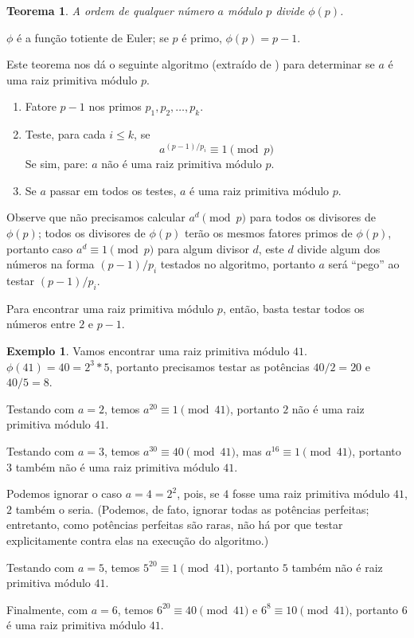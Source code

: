 \documentclass{article}
\newtheorem{theorem}{Teorema}
\theoremstyle{definition}
\newtheorem{example}{Exemplo}
\begin{document}
\begin{theorem}
    A ordem de qualquer número $a$ módulo $p$ divide $\phi(p)$.
\end{theorem}

$\phi$ é a função totiente de Euler;
se $p$ é primo, $\phi(p) = p-1$.

Este teorema nos dá o seguinte algoritmo
(extraído de \cite{PrimitiveRootsStackOverflow})
para determinar se $a$ é uma raiz primitiva módulo $p$.

\begin{enumerate}
    \item Fatore $p-1$ nos primos $p_1, p_2, \ldots, p_k$.
    \item Teste, para cada $i \leq k$, se
        \begin{equation*}
            a^{(p-1)/p_i} \equiv 1 \pmod p
        \end{equation*}
        Se sim, pare: $a$ não é uma raiz primitiva módulo $p$.
    \item Se $a$ passar em todos os testes,
        $a$ é uma raiz primitiva módulo $p$.
\end{enumerate}

Observe que não precisamos calcular $a^d \pmod p$
para todos os divisores de $\phi(p)$;
todos os divisores de $\phi(p)$ terão os mesmos fatores primos de $\phi(p)$,
portanto caso $a^d \equiv 1 \pmod p$ para algum divisor $d$,
este $d$ divide algum dos números na forma $(p-1)/p_i$ testados no algoritmo,
portanto $a$ será ``pego'' ao testar $(p-1)/p_i$.

Para encontrar uma raiz primitiva módulo $p$,
então,
basta testar todos os números entre $2$ e $p-1$.

\begin{example}
    Vamos encontrar uma raiz primitiva módulo $41$.
    $\phi(41) = 40 = 2^3*5$,
    portanto precisamos testar as potências $40/2 = 20$ e $40/5 = 8$.

    Testando com $a = 2$, temos $a^{20} \equiv 1 \pmod{41}$,
    portanto $2$ não é uma raiz primitiva módulo $41$.

    Testando com $a = 3$, temos $a^{30} \equiv 40 \pmod{41}$,
    mas $a^{16} \equiv 1 \pmod{41}$,
    portanto $3$ também não é uma raiz primitiva módulo $41$.

    Podemos ignorar o caso $a = 4 = 2^2$,
    pois, se $4$ fosse uma raiz primitiva módulo $41$,
    $2$ também o seria.
    (Podemos, de fato, ignorar todas as potências perfeitas;
    entretanto,
    como potências perfeitas são raras,
    não há por que testar explicitamente contra elas na execução do algoritmo.)

    Testando com $a = 5$, temos $5^{20} \equiv 1 \pmod{41}$,
    portanto $5$ também não é raiz primitiva módulo $41$.

    Finalmente, com $a = 6$, temos $6^{20} \equiv 40 \pmod{41}$
    e $6^8 \equiv 10 \pmod{41}$,
    portanto $6$ é uma raiz primitiva módulo $41$.
\end{example}
\end{document}
